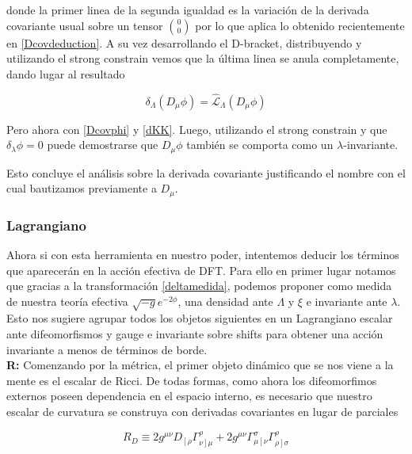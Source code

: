 \documentclass{article}
\numberwithin{equation}{section}
\begin{document}
donde la primer linea de la segunda igualdad es la variación de la derivada covariante usual sobre un tensor $ \binom{0}{0} $ por lo que aplica lo obtenido recientemente en \ref{Dcovdeduction}. A su vez desarrollando el D-bracket, distribuyendo y utilizando el strong constrain vemos que la última linea se anula completamente, dando lugar al resultado\\

\begin{boxquation}
	\begin{equation}\label{Dphiescalar}
	\delta_{\Lambda} \left( D_{\mu} \phi \right) = \hat{\mathcal{L}}_{\Lambda} \left( D_{\mu} \phi \right)
	\end{equation}
\end{boxquation}


Pero ahora con \ref{Dcovphi} y \ref{dKK}. Luego, utilizando el strong constrain y que $ \delta_{\lambda} \phi = 0 $ puede demostrarse que $ D_{\mu} \phi $ también se comporta como un $ \lambda$-invariante.

Esto concluye el análisis sobre la derivada covariante justificando el nombre con el cual bautizamos previamente a $ D_{\mu} $.\\

\subsubsection{Lagrangiano}

Ahora si con esta herramienta en nuestro poder, intentemos deducir los términos que aparecerán en la acción efectiva de DFT. Para ello en primer lugar notamos que gracias a la transformación \ref{deltamedida}, podemos proponer como medida de nuestra teoría efectiva $ \sqrt{-g}e^{-2\phi} $, una densidad ante $ \Lambda $ y $ \xi $ e invariante ante $ \lambda $. Esto nos sugiere agrupar todos los objetos siguientes en un Lagrangiano escalar ante difeomorfismos y gauge e invariante sobre shifts para obtener una acción invariante a menos de términos de borde.\\


\textbf{R:} Comenzando por la métrica, el primer objeto dinámico que se nos viene a la mente es el escalar de Ricci. De todas formas, como ahora los difeomorfimos externos poseen dependencia en el espacio interno, es necesario que nuestro escalar de curvatura se construya con derivadas covariantes en lugar de parciales

\begin{equation}\label{riccig}
R_D \equiv 2 g^{\mu \nu} D_{\left[ \rho \right.} \Gamma^{\rho}_{\left. \nu \right] \mu} +   2g^{\mu \nu}\Gamma^{\sigma}_{\mu \left[ \nu \right.}\Gamma^{\rho}_{ \left. \rho \right] \sigma}
\end{equation} 
\end{document}
